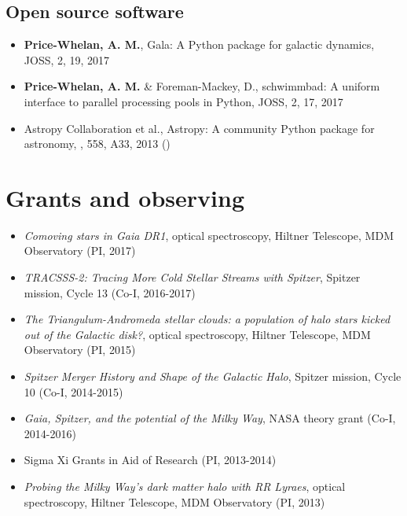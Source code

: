 \documentclass[12pt,letterpaper]{article}
\begin{document}
    \subsection*{Open source software}
    \begin{itemize}

\item {\bf Price-Whelan, A. M.},
    {Gala: A Python package for galactic dynamics},
    JOSS, 2, 19, 2017

\item {\bf Price-Whelan, A. M.} \& Foreman-Mackey, D.,
    {schwimmbad: A uniform interface to parallel processing pools in Python},
    JOSS, 2, 17, 2017

\item Astropy Collaboration et al.,
    {Astropy: A community Python package for astronomy},
    \aanda, 558, A33, 2013 ()

	\end{itemize}

\section*{Grants and observing }

	\begin{itemize}
    \item {\it Comoving stars in Gaia DR1}, optical spectroscopy, Hiltner Telescope, MDM Observatory (PI, 2017)
    \item {\it TRACSSS-2: Tracing More Cold Stellar Streams with Spitzer}, Spitzer mission, Cycle 13 (Co-I, 2016-2017)
	\item {\it The Triangulum-Andromeda stellar clouds: a population of halo stars kicked out of the Galactic disk?}, optical spectroscopy, Hiltner Telescope, MDM Observatory (PI, 2015)
	\item {\it Spitzer Merger History and Shape of the Galactic Halo}, Spitzer mission, Cycle 10 (Co-I, 2014-2015)
	\item {\it Gaia, Spitzer, and the potential of the Milky Way}, NASA theory grant (Co-I, 2014-2016)
	\item Sigma Xi Grants in Aid of Research (PI, 2013-2014)
	\item {\it Probing the Milky Way's dark matter halo with RR Lyraes}, optical spectroscopy, Hiltner Telescope, MDM Observatory (PI, 2013)
	\end{itemize}
\end{document}
